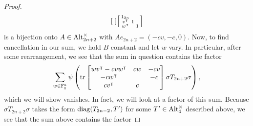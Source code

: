 \begin{proof}
\[\begin{array}{cccccc}
\begin{bsmallmatrix}
        \end{bsmallmatrix}\begin{bsmallmatrix}
            1_{2n} \\ v^\intercal & 1 \\ w^\intercal && 1
        \end{bsmallmatrix}
    \end{array}\]
    is a bijection onto $A\in\operatorname{Alt}_{2n+2}^\times$ with $Ae_{2n+2}=(-cv,-c,0)$.
    Now, to find cancellation in our sum, we hold $B$ constant and let $w$ vary.
    In particular, after some rearrangement, we see that the sum in question contains the factor
    \[\sum_{w\in\mathbb F_q^n}\psi\left(\operatorname{tr}\begin{bmatrix}
        wv^\intercal-cvw^\intercal & cw & -cv \\
        -cw^\intercal && -c \\
        cv^\intercal & c
    \end{bmatrix}\sigma T_{2n+2}\sigma\right),\]
    which we will show vanishes. In fact, we will look at a factor of this sum. Because $\sigma T_{2n+2}\sigma$ takes the form $\operatorname{diag}(T_{2n-2},T')$ for some $T'\in\operatorname{Alt}_4^\times$ described above, we see that the sum above contains the factor

\end{proof}
